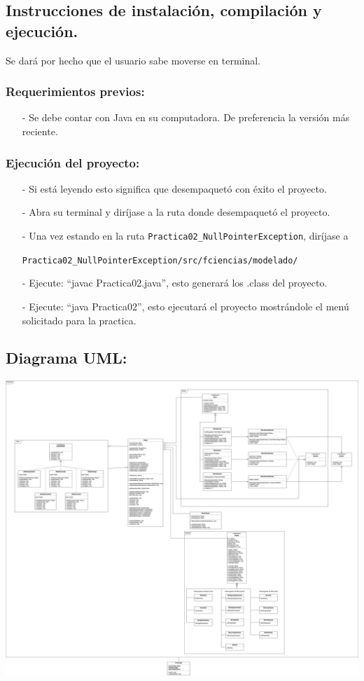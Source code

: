 \documentclass{article}
\newcommand{\code}[1]{\textcolor{white!25!black}{\texttt{#1}}}
\begin{document}
\subsection*{Instrucciones de instalación, compilación y ejecución.}
Se dará por hecho que el usuario sabe moverse en terminal.\\

\subsubsection*{Requerimientos previos:}
\begin{itemize}
\item[-] Se debe contar con Java en su computadora. De preferencia la versión más reciente.
\end{itemize}

\subsubsection*{Ejecución del proyecto:}
\begin{itemize}
\item[-] Si está leyendo esto significa que desempaquetó con éxito el proyecto.
\item[-] Abra su terminal y diríjase a la ruta donde desempaquetó el proyecto.
\item[-] Una vez estando en la ruta \code{Practica02\_NullPointerException}, diríjase a

  \code{Practica02\_NullPointerException/src/fciencias/modelado/}
\item[-] Ejecute: “javac Practica02.java”, esto generará los .class del proyecto.
\item[-] Ejecute: “java Practica02”, esto ejecutará el proyecto mostrándole el menú solicitado para la practica.
\end{itemize}

\subsection*{Diagrama UML:}
\begin{center}
  \includegraphics[scale=0.12]{./Practica02UML.png}
\end{center}
\end{document}

